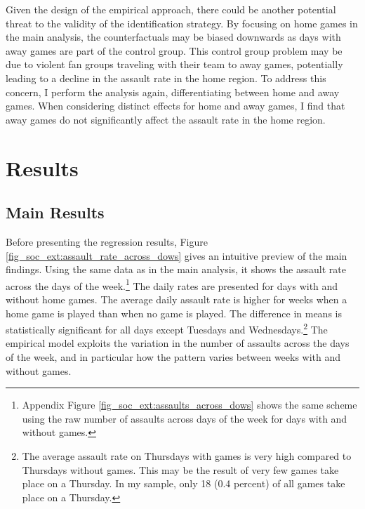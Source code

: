 Given the design of the empirical approach, there could be another potential threat to the validity of the identification strategy. By focusing on home games in the main analysis, the counterfactuals may be biased downwards as days with away games are part of the control group. This control group problem may be due to violent fan groups traveling with their team to away games, potentially leading to a decline in the assault rate in the home region. To address this concern, I perform the analysis again, differentiating between home and away games. When considering distinct effects for home and away games, I find that away games do not significantly affect the assault rate in the home region. 









\bigskip
\section{Results}\label{sec_soc_ext:results}



\subsection{Main Results}



Before presenting the regression results, Figure \ref{fig_soc_ext:assault_rate_across_dows} gives an intuitive preview of the main findings. Using the same data as in the main analysis, it shows the assault rate across the days of the week.\footnote{Appendix Figure \ref{fig_soc_ext:assaults_across_dows} shows the same scheme using the raw number of assaults across days of the week for days with and without games.} The daily rates are presented for days with and without home games. The average daily assault rate is higher for weeks when a home game is played than when no game is played. The difference in means is statistically significant for all days except Tuesdays and Wednesdays.\footnote{The average assault rate on Thursdays with games is very high compared to Thursdays without games. This may be the result of very few games take place on a Thursday. In my sample, only 18 (0.4 percent) of all games take place on a Thursday.} The empirical model exploits the variation in the number of assaults across the days of the week, and in particular how the pattern varies between weeks with and without games.



